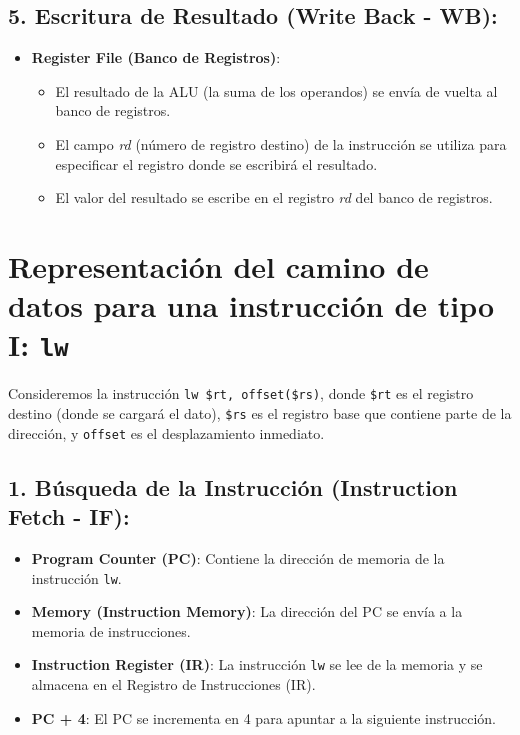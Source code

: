 \documentclass{article}
\begin{document}
\subsection*{5. Escritura de Resultado (Write Back - WB):}
\begin{itemize}
    \item \textbf{Register File (Banco de Registros)}:
    \begin{itemize}
        \item El resultado de la ALU (la suma de los operandos) se envía de vuelta al banco de registros.
        \item El campo \textit{rd} (número de registro destino) de la instrucción se utiliza para especificar el registro donde se escribirá el resultado.
        \item El valor del resultado se escribe en el registro \textit{rd} del banco de registros.
    \end{itemize}
\end{itemize}

\section{Representación del camino de datos para una instrucción de tipo I: \texttt{lw}}
Consideremos la instrucción \texttt{lw \$rt, offset(\$rs)}, donde \texttt{\$rt} es el registro destino (donde se cargará el dato), \texttt{\$rs} es el registro base que contiene parte de la dirección, y \texttt{offset} es el desplazamiento inmediato.

\subsection*{1. Búsqueda de la Instrucción (Instruction Fetch - IF):}
\begin{itemize}
    \item \textbf{Program Counter (PC)}: Contiene la dirección de memoria de la instrucción \texttt{lw}.
    \item \textbf{Memory (Instruction Memory)}: La dirección del PC se envía a la memoria de instrucciones.
    \item \textbf{Instruction Register (IR)}: La instrucción \texttt{lw} se lee de la memoria y se almacena en el Registro de Instrucciones (IR).
    \item \textbf{PC + 4}: El PC se incrementa en 4 para apuntar a la siguiente instrucción.
\end{itemize}
\end{document}
